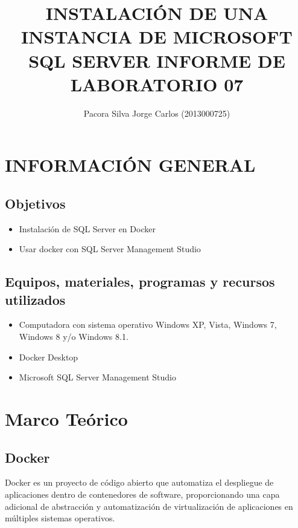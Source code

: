 \documentclass[preprint,12pt]{elsarticle}
\begin{document}
	
	\begin{frontmatter} 

		\title{\huge INSTALACIÓN DE UNA INSTANCIA DE MICROSOFT SQL SERVER INFORME DE LABORATORIO 07 }
		
		\author{Pacora Silva Jorge Carlos         	(2013000725)} 
		\address{Escuela Profesional de Ingeniería de Sistemas}
		\address{Universidad Privada de Tacna}
		\address{Tacna, Perú}
	\end{frontmatter}



\section{INFORMACIÓN GENERAL} 

\subsection {\textbf{Objetivos}}
\begin{itemize}
	\item Instalación de SQL Server en Docker
	\item Usar docker con SQL Server Management Studio
\end{itemize}

\subsection {\textbf{Equipos, materiales, programas y recursos utilizados}}
\begin{itemize}
	\item Computadora con sistema operativo Windows XP, Vista, Windows 7, Windows 8 y/o Windows 8.1.
	\item Docker Desktop
	\item Microsoft SQL Server Management Studio
\end{itemize}


\section{Marco Teórico}


\subsection {\textbf{Docker}}
Docker es un proyecto de código abierto que automatiza el despliegue de aplicaciones dentro de contenedores de software, proporcionando una capa adicional de abstracción y automatización de virtualización de aplicaciones en múltiples sistemas operativos.
\end{document}
